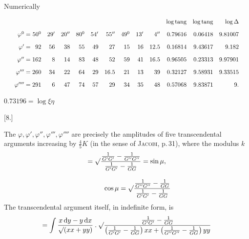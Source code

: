 \begin{landscape}

Numerically
\par\nopagebreak%
\begingroup\small\relax\setlength{\arraycolsep}{2pt}\[
\resizebox{.98\linewidth}{!}{$\displaystyle \begin{array}{r@{\;}c@{\;}rrr@{\quad}rrr@{\quad}rrr@{\quad}rrr} &&&&&&&&&&&\log\operatorname{tang}&\log\operatorname{tang}&\log\Delta\\[9pt] \varphi^0&=&50^0&29'&20''&80^0&54'&55''&49^0&13'&4''&0.79616&0.06418&9.81007\\[9pt] \varphi'&=&92&56&38&55&49&27&15&16&12.5&0.16814&9.43617&9.182\\[9pt] \varphi''&=&162&8&14&83&48&52&59&41&16.5&0.96505&0.23313&9.97901\\[9pt] \varphi'''&=&260&34&22&64&29&16.5&21&13&39&0.32127&9.58931&9.33515\\[9pt] \varphi''''&=&291&6&47&74&57&29&34&35&48&0.57068&9.83871&9. \end{array}$}
\]\endgroup\par%

\hfill $0.73196=\log\xi\eta$\hspace*{.12\textwidth}\par


\end{landscape}
\par\medskip{}\centerline{[8.]}\nobreak\smallskip
The $\varphi,\varphi',\varphi'',\varphi''',\varphi''''$ are precisely the amplitudes of five transcendental arguments increasing by $\frac45K$ (in the sense of \textsc{Jacobi},
p.\,31), where the modulus $k$
\[
\begin{gathered}=\surd\frac{\frac{1}{G'G'}-\frac{1}{G''G''}}{\frac{1}{G'G'}-\frac{1}{GG}} =\sin\mu,\\[9pt]\quad{}\qquad \cos\mu=\surd\frac{\frac{1}{G''G''}-\frac{1}{GG}}{\frac{1}{G'G'}-\frac{1}{GG}}\end{gathered}
\]
The transcendental argument itself, in indefinite form, is
\[
=\int\frac{x\,\mathrm{d}y-y\,\mathrm{d}x}{\surd(xx+yy)}\mathbin{.} \surd\frac{\frac{1}{G'G'}-\frac{1}{GG}} {\left(\frac{1}{G'G'}-\frac{1}{GG}\right)xx+\left(\frac{1}{G''G''}-\frac{1}{GG}\right)yy}
\]

